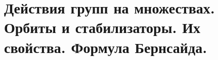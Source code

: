 \section{
    Действия групп на множествах. Орбиты и стабилизаторы. Их свойства. Формула Бернсайда.
}




